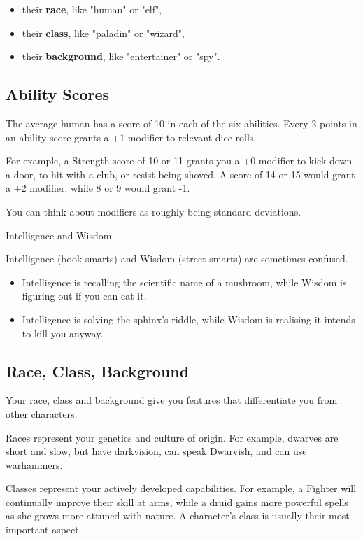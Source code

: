 \documentclass[letterpaper,twocolumn,openany,nodeprecatedcode]{dndbook}
\begin{document}
\begin{itemize}
\item their \textbf{race}, like "human" or "elf",
\item their \textbf{class}, like "paladin" or "wizard",
\item their \textbf{background}, like "entertainer" or "spy".
\end{itemize}

\subsection{Ability Scores}
The average human has a score of 10 in each of the six abilities. Every 2 points in an ability score grants a +1 modifier to relevant dice rolls. 

For example, a Strength score of 10 or 11 grants you a +0 modifier to kick down a door, to hit with a club, or resist being shoved. A score of 14 or 15 would grant a +2 modifier, while 8 or 9 would grant -1.

You can think about modifiers as roughly being standard deviations.

\begin{DndComment}{Intelligence and Wisdom}

\noindent Intelligence (book-smarts) and Wisdom (street-smarts) are sometimes confused.
\begin{itemize}
\item Intelligence is recalling the scientific name of a mushroom, while Wisdom is figuring out if you can eat it.
\item Intelligence is solving the sphinx's riddle, while Wisdom is realising it intends to kill you anyway.
\end{itemize}
\end{DndComment}

\subsection{Race, Class, Background}
Your race, class and background give you features that differentiate you from other characters. 

Races represent your genetics and culture of origin. For example, dwarves are short and slow, but have darkvision, can speak Dwarvish, and can use warhammers. 

Classes represent your actively developed capabilities. For example, a Fighter will continually improve their skill at arms, while a druid gains more powerful spells as she grows more attuned with nature. A character's class is usually their most important aspect.
\end{document}
